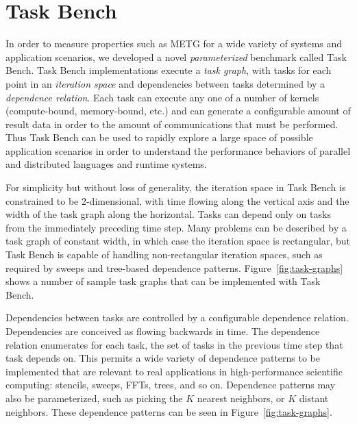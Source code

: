 \section{Task Bench}
\label{sec:task-bench}

In order to measure properties such as METG for a wide variety of
systems and application scenarios, we developed a novel
\emph{parameterized} benchmark called Task Bench. Task Bench
implementations execute a \emph{task graph}, with tasks for each point
in an \emph{iteration space} and dependencies between tasks determined
by a \emph{dependence relation}. Each task can execute any one of a
number of kernels (compute-bound, memory-bound, etc.) and can generate
a configurable amount of result data in order to the amount of
communications that must be performed. Thus Task Bench can be used to
rapidly explore a large space of possible application scenarios in
order to understand the performance behaviors of parallel and
distributed languages and runtime systems.

For simplicity but without loss of generality, the iteration space in
Task Bench is constrained to be 2-dimensional, with time flowing along
the vertical axis and the width of the task graph along the
horizontal. Tasks can depend only on tasks from the immediately
preceding time step. Many problems can be described by a task graph of
constant width, in which case the iteration space is rectangular, but
Task Bench is capable of handling non-rectangular iteration spaces,
such as required by sweeps and tree-based dependence
patterns. Figure~\ref{fig:task-graphs} shows a number of sample task
graphs that can be implemented with Task Bench.


Dependencies between tasks are controlled by a configurable dependence
relation. Dependencies are conceived as flowing backwards in time. The
dependence relation enumerates for each task, the set of tasks in the
previous time step that task depends on. This permits a wide variety
of dependence patterns to be implemented that are relevant to real
applications in high-performance scientific computing: stencils,
sweeps, FFTs, trees, and so on. Dependence patterns may also be
parameterized, such as picking the $K$ nearest neighbors, or $K$
distant neighbors. These dependence patterns can be seen in
Figure~\ref{fig:task-graphs}.

